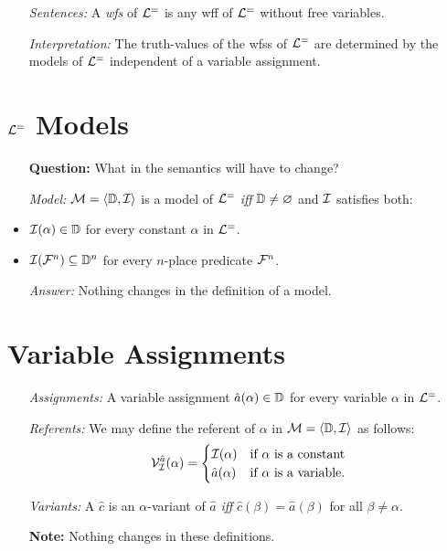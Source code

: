 \documentclass[a4paper, 11pt]{article} %
\begin{document}
\begin{enumerate}
  \item[\it Sentences:] A \textit{wfs} of $\mathcal{L}^=$ is any wff of $\mathcal{L}^=$ without free variables.
  \item[\it Interpretation:] The truth-values of the wfss of $\mathcal{L}^=$ are determined by the models of $\mathcal{L}^=$ independent of a variable assignment.
\end{enumerate}





\section*{$\mathcal{L}^=$ Models}

\begin{itemize}
  \item[\bf Question:] What in the semantics will have to change?
  \item[\it Model:] $\mathcal{M}=\langle\mathbb{D},\mathcal{I}\rangle$ is a model of $\mathcal{L}^=$ \textit{iff} $\mathbb{D} \neq \varnothing$ and $\mathcal{I}$ satisfies both:
    \item $\mathcal{I}(\alpha)\in\mathbb{D}$ for every constant $\alpha$ in $\mathcal{L}^=$. 
    \item $\mathcal{I}(\mathcal{F}^n)\subseteq\mathbb{D}^n$ for every $n$-place predicate $\mathcal{F}^n$.
  \item[\it Answer:] Nothing changes in the definition of a model.
\end{itemize}





\section*{Variable Assignments}

\begin{enumerate}
  \item[\it Assignments:] A variable assignment $\hat{a}(\alpha)\in\mathbb{D}$ for every variable $\alpha$ in $\mathcal{L}^=$.
  \item[\it Referents:] We may define the referent of $\alpha$ in $\mathcal{M}=\langle\mathbb{D},\mathcal{I}\rangle$ as follows:
    \begin{align*}
      \mathcal{V}_{\mathcal{I}}^{\hat{a}}{(\alpha)}=
        \begin{cases}
          \mathcal{I}(\alpha) & \text{if } \alpha \text{ is a constant} \\
          \hat{a}(\alpha) & \text{if } \alpha \text{ is a variable.}
        \end{cases}
    \end{align*}
  \item[\it Variants:] A $\hat{c}$ is an $\alpha$-variant of $\hat{a}$ \textit{iff} $\hat{c}(\beta)=\hat{a}(\beta)$ for all $\beta\neq\alpha$.
  \item[\bf Note:] Nothing changes in these definitions.
\end{enumerate}
\end{document}
